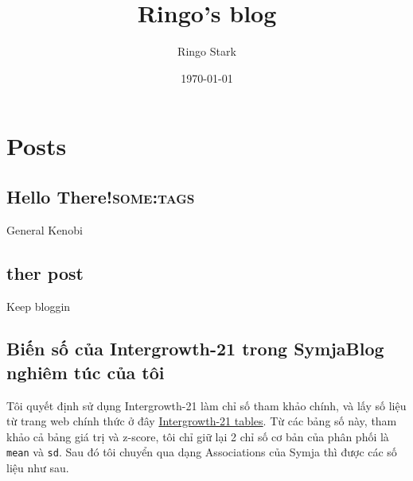 \documentclass[11pt]{article}
\author{Ringo Stark}
\date{\today}
\title{Ringo's blog}
\begin{document}
\maketitle
\tableofcontents


\section{Posts}
\label{sec:org6423547}
\subsection{Hello There!\hfill{}\textsc{some:tags}}
\label{sec:orgf094663}
General Kenobi
\subsection{ther post}
\label{sec:orgca7659c}
Keep bloggin

\subsection{Biến số của Intergrowth-21 trong SymjaBlog nghiêm túc của tôi}
\label{sec:org3449bcb}
Tôi quyết định sử dụng Intergrowth-21 làm chỉ số tham khảo chính, và lấy số liệu từ trang web chính thức ở đây \href{https://intergrowth21.tghn.org/fetal-growth/\#fg1}{Intergrowth-21 tables}. Từ các bảng số này, tham khảo cả bảng giá trị và z-score, tôi chỉ giữ lại 2 chỉ số cơ bản của phân phối là \texttt{mean} và \texttt{sd}. Sau đó tôi chuyển qua dạng Associations của Symja thì được các số liệu như sau.
\end{document}
